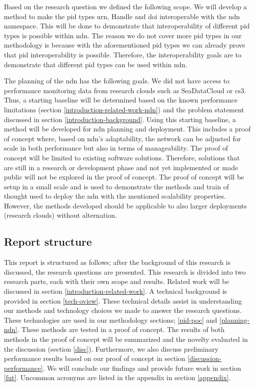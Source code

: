 
Based on the research question we defined the following scope. We will develop a method to make the \gls{pid} types \gls{urn}, Handle and \gls{doi} interoperable with the \gls{ndn} namespace. This will be done to demonstrate that interoperability of different \gls{pid} types is possible within \gls{ndn}. The reason we do not cover more \gls{pid} types in our methodology is because with the aforementioned \gls{pid} types we can already prove that \gls{pid} interoperability is possible. Therefore, the interoperability goals are to demonstrate that different \gls{pid} types can be used within \gls{ndn}.

The planning of the \gls{ndn} has the following goals. We did not have access to performance monitoring data from research clouds such as SeaDataCloud or \gls{cs3}. Thus, a starting baseline will be determined based on the known performance limitations (section \ref{introduction-related-work-ndn}) and the problem statement discussed in section \ref{introduction-background}. Using this starting baseline, a method will be developed for \gls{ndn} planning and deployment. This includes a proof of concept where, based on \gls{ndn}'s adaptability, the network can be adjusted for scale in both performance but also in terms of manageability. The proof of concept will be limited to existing software solutions. Therefore, solutions that are still in a research or development phase and not yet implemented or made public will not be explored in the proof of concept. The proof of concept will be setup in a small scale and is used to demonstrate the methods and train of thought used to deploy the \gls{ndn} with the mentioned scalability properties. However, the methods developed should be applicable to also larger deployments (research clouds) without alternation.

\subsection{Report structure}
This report is structured as follows; after the background of this research is discussed, the research questions are presented. This research is divided into two research parts, each with their own scope and results. Related work will be discussed in section \ref{introduction-related-work}. A technical background is provided in section \ref{tech-oview}. These technical details assist in understanding our methods and technology choices we made to answer the research questions. These technologies are used in our methodology sections; \ref{pid-poc} and \ref{planning-ndn}. These methods are tested in a proof of concept. The results of both methods in the proof of concept will be summarized and the novelty evaluated in the discussion (section \ref{disc}). Furthermore, we also discuss preliminary performance results based on our proof of concept in section \ref{discussion-performance}. We will conclude our findings and provide future work in section \ref{fut}. Uncommon acronyms are listed in the appendix in section \ref{appendix}.



